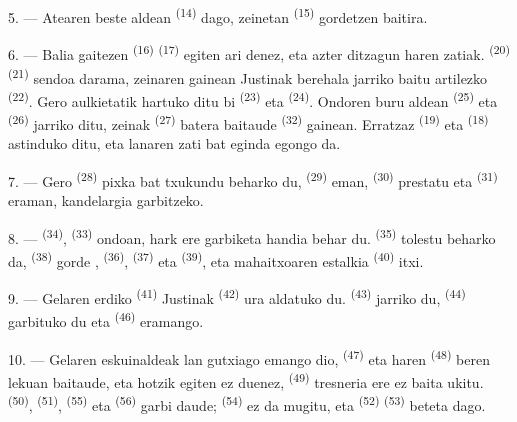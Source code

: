 5. --- Atearen beste aldean  \textsuperscript{(14)} dago,
zeinetan  \textsuperscript{(15)} gordetzen baitira.

6. --- Balia gaitezen  \textsuperscript{(16)} 
\textsuperscript{(17)} egiten ari denez, eta azter ditzagun haren zatiak.
 \textsuperscript{(20)} 
\textsuperscript{(21)} sendoa darama, zeinaren gainean Justinak berehala jarriko
baitu artilezko  \textsuperscript{(22)}. Gero aulkietatik hartuko
ditu bi  \textsuperscript{(23)} eta 
\textsuperscript{(24)}. Ondoren buru aldean 
\textsuperscript{(25)} eta  \textsuperscript{(26)} jarriko ditu,
zeinak  \textsuperscript{(27)} batera baitaude
 \textsuperscript{(32)} gainean. Erratzaz
 \textsuperscript{(19)} eta 
\textsuperscript{(18)} astinduko ditu, eta lanaren zati bat eginda egongo da.

7. --- Gero  \textsuperscript{(28)} pixka bat
txukundu beharko du,  \textsuperscript{(29)} eman,
 \textsuperscript{(30)} prestatu eta 
\textsuperscript{(31)} eraman, kandelargia garbitzeko.

\VUsaut{5.0mm}
\VUsaut{3.0mm}

8. ---  \textsuperscript{(34)}, 
\textsuperscript{(33)} ondoan, hark ere garbiketa handia behar du.
 \textsuperscript{(35)} tolestu beharko da, 
\textsuperscript{(38)} gorde , 
\textsuperscript{(36)},  \textsuperscript{(37)} eta
 \textsuperscript{(39)}, eta mahaitxoaren estalkia
 \textsuperscript{(40)} itxi.

9. --- Gelaren erdiko  \textsuperscript{(41)} Justinak
 \textsuperscript{(42)} ura aldatuko du. 
 \textsuperscript{(43)} jarriko du, 
\textsuperscript{(44)} garbituko du eta 
\textsuperscript{(46)} eramango.

10. --- Gelaren eskuinaldeak lan gutxiago emango dio, 
\textsuperscript{(47)} eta haren  \textsuperscript{(48)} beren
lekuan baitaude, eta hotzik egiten ez duenez, 
\textsuperscript{(49)} tresneria ere ez baita ukitu. 
\textsuperscript{(50)},  \textsuperscript{(51)},
 \textsuperscript{(55)} eta 
\textsuperscript{(56)} garbi daude; 
\textsuperscript{(54)} ez da mugitu, eta 
\textsuperscript{(52)}  \textsuperscript{(53)} beteta dago.

